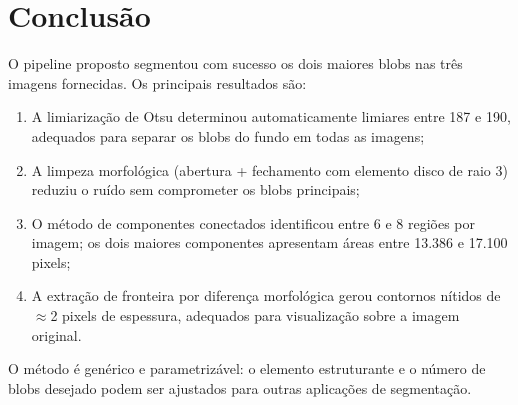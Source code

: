 \documentclass[12pt,a4paper,oneside,brazil,chapter=TITLE,section=TITLE]{abntex2}
\begin{document}
\chapter{Conclus\~ao}

O pipeline proposto segmentou com sucesso os dois maiores blobs nas
tr\^es imagens fornecidas.
Os principais resultados s\~ao:

\begin{enumerate}
  \item A limiariza\c{c}\~ao de Otsu determinou automaticamente limiares
        entre 187 e 190, adequados para separar os blobs do fundo em
        todas as imagens;
  \item A limpeza morfol\'ogica (abertura + fechamento com elemento disco
        de raio 3) reduziu o ru\'ido sem comprometer os blobs principais;
  \item O m\'etodo de componentes conectados identificou entre 6 e
        8 regi\~oes por imagem; os dois maiores componentes apresentam
        \'areas entre 13.386 e 17.100 pixels;
  \item A extra\c{c}\~ao de fronteira por diferen\c{c}a morfol\'ogica
        gerou contornos n\'itidos de $\approx$2 pixels de espessura,
        adequados para visualiza\c{c}\~ao sobre a imagem original.
\end{enumerate}

O m\'etodo \'e gen\'erico e parametriz\'avel: o elemento estruturante
e o n\'umero de blobs desejado podem ser ajustados para outras
aplica\c{c}\~oes de segmenta\c{c}\~ao.

\postextual

\end{document}
